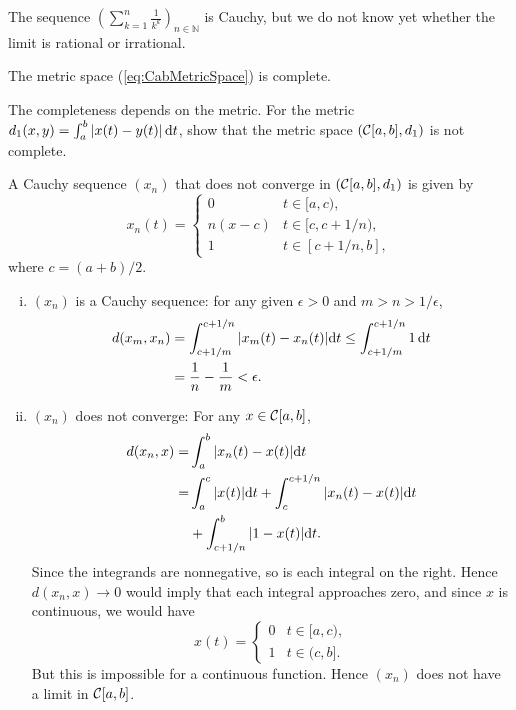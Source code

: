\begin{exm}
  The sequence $(\sum_{k=1}^n\frac{1}{k^k})_{n\in\mathbb{N}}$
  is Cauchy, 
  but we do not know yet
  whether the limit is rational or irrational.
\end{exm}

\begin{lem}
  \label{lem:CabMetricSpace}
  The metric space (\ref{eq:CabMetricSpace}) is complete.
\end{lem}

\begin{exc}
  The completeness depends on the metric.
  For the metric 
  $d_1(x,y)=\int_a^b|x(t)-y(t)|\,\mathrm{d} t$,
  show that the metric space $({\cal C}[a,b],d_1)$
  is not complete.
\end{exc}
\begin{solution}
  A Cauchy sequence $(x_n)$
  that does not converge in $({\cal C}[a,b],d_1)$ is given by
  \begin{equation*}
    x_n(t) =
    \begin{cases}
      0 & t\in [a, c), \\
      n(x-c) & t\in [c, c+1/n), \\
      1 & t\in [c+1/n, b],
    \end{cases}
  \end{equation*}
  where $c = (a+b)/2$.
  \begin{enumerate}[(i)]
  \item
    $(x_n)$ is a Cauchy sequence:
    for any given $\epsilon > 0$ and
    $m > n > 1/\epsilon$,
    \begin{align*}
      d(x_m, x_n) &= \int_{c+1/m}^{c+1/n}|x_m(t) - x_n(t)| \mathrm{d} t \le \int_{c+1/m}^{c+1/n} 1 \,\mathrm{d} t \\
      &= \frac{1}{n} - \frac{1}{m} < \epsilon.
    \end{align*}
  \item
    $(x_n)$ does not converge:
    For any $x\in {\cal C}[a, b]$,
    \begin{align*}
      d(x_n, x) =& \int_a^b|x_n(t) - x(t)| \mathrm{d} t \\
      =& \int_a^c|x(t)|\mathrm{d} t + \int_c^{{c+1/n}}|x_n(t) - x(t)| \mathrm{d} t \\
      &+ \int_{c+1/n}^b|1 - x(t)| \mathrm{d} t.
    \end{align*}
    Since the integrands are nonnegative,
    so is each integral on the right.
    Hence $d(x_n, x)\rightarrow 0$ would imply that
    each integral approaches zero,
    and since $x$ is continuous,
    we would have
    \begin{equation*}
      x(t) =
      \begin{cases}
        0 & t\in [a, c), \\
        1 & t\in (c, b].
      \end{cases}
    \end{equation*}
    But this is impossible for a continuous function.
    Hence $(x_n)$ does not have a limit in ${\cal C}[a, b]$.
  \end{enumerate}
\end{solution}

